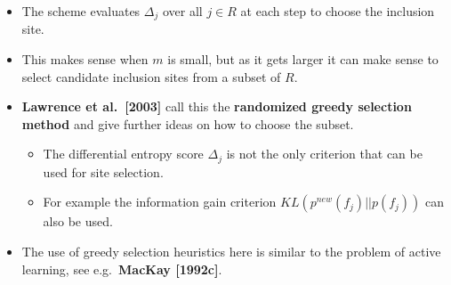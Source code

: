 \documentclass[
  ignorenonframetext,
]{beamer}
\providecommand{\tightlist}{%
  \setlength{\itemsep}{0pt}\setlength{\parskip}{0pt}}
\begin{document}
\begin{frame}{}
\protect\hypertarget{section-19}{}
\begin{itemize}
\item
  The scheme evaluates \(\Delta_j\) over all \(j \in R\) at each step to
  choose the inclusion site.
\item
  This makes sense when \(m\) is small, but as it gets larger it can
  make sense to select candidate inclusion sites from a subset of \(R\).
\item
  \textbf{Lawrence et al.~{[}2003{]}} call this the \textbf{randomized
  greedy selection method} and give further ideas on how to choose the
  subset.

  \begin{itemize}
  \tightlist
  \item
    The differential entropy score \(\Delta_j\) is not the only
    criterion that can be used for site selection.
  \item
    For example the information gain criterion
    \(KL(p^{new}(f_j)||p(f_j))\) can also be used.
  \end{itemize}
\item
  The use of greedy selection heuristics here is similar to the problem
  of active learning, see e.g.~\textbf{MacKay {[}1992c{]}}.
\end{itemize}
\end{frame}
\end{document}
